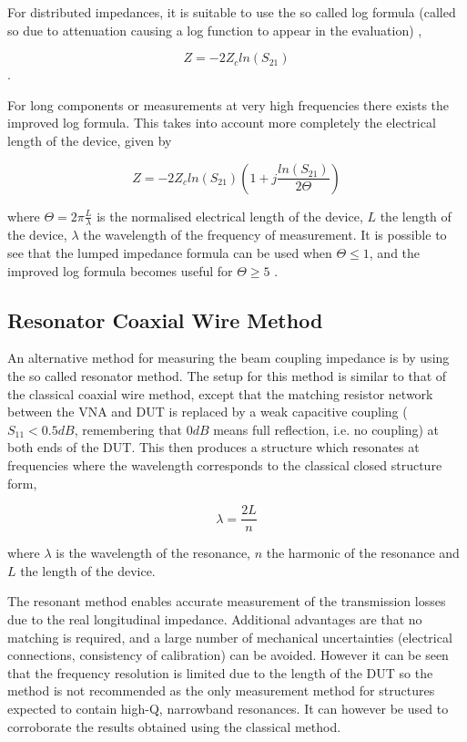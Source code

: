 For distributed impedances, it is suitable to use the so called log formula (called so due to attenuation causing a log function to appear in the evaluation) \cite{Hahn:BenchMeasInter, Hahn: ValidityImpMeas, Jensen:ImprovLogForm},

\begin{equation}
Z = -2Z_{c} ln \left( S_{21} \right)
\end{equation}.

For long components or measurements at very high frequencies there exists the improved log formula. This takes into account more completely the electrical length of the device, given by

\begin{equation}
Z = -2Z_{c} ln \left( S_{21}  \right) \left( 1 + j\frac{ln \left( S_{21}\right) }{2\Theta}  \right)
\end{equation}

where $\Theta = 2\pi \frac{L}{\lambda}$ is the normalised electrical length of the device, $L$ the length of the device, $\lambda$ the wavelength of the frequency of measurement. It is possible to see that the lumped impedance formula can be used when $\Theta \leq 1$, and the improved log formula becomes useful for $\Theta \geq 5$ \cite{Jensen:ImprovLogForm}.




\subsection{Resonator Coaxial Wire Method}
\label{sec:reson-coax-meth}

An alternative method for measuring the beam coupling impedance is by using the so called resonator method. The setup for this method is similar to that of the classical coaxial wire method, except that the matching resistor network between the VNA and DUT is replaced by a weak capacitive coupling ($S_{11} < 0.5dB$, remembering that $0dB$ means full reflection, i.e. no coupling) at both ends of the DUT. This then produces a structure which resonates at frequencies where the wavelength corresponds to the classical closed structure form,

\begin{equation}
\lambda = \frac{2L}{n}
\end{equation}

where $\lambda$ is the wavelength of the resonance, $n$ the harmonic of the resonance and $L$ the length of the device. 

The resonant method enables accurate measurement of the transmission losses due to the real longitudinal impedance. Additional advantages are that no matching is required, and a large number of mechanical uncertainties (electrical connections, consistency of calibration) can be avoided. However it can be seen that the frequency resolution is limited due to the length of the DUT so the method is not recommended as the only measurement method for structures expected to contain high-Q, narrowband resonances. It can however be used to corroborate the results obtained using the classical method.

